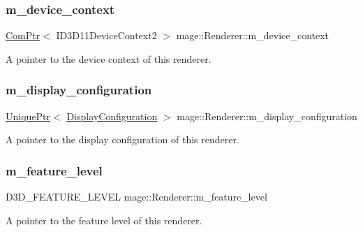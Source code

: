 \subsubsection{\texorpdfstring{m\+\_\+device\+\_\+context}{m\_device\_context}}
{\footnotesize\ttfamily \hyperlink{namespacemage_ae74f374780900893caa5555d1031fd79}{Com\+Ptr}$<$ I\+D3\+D11\+Device\+Context2 $>$ mage\+::\+Renderer\+::m\+\_\+device\+\_\+context\hspace{0.3cm}{\ttfamily [private]}}

A pointer to the device context of this renderer. \hypertarget{classmage_1_1_renderer_ab5638066fba5a0b9ce307f7db3ba5433}{}\label{classmage_1_1_renderer_ab5638066fba5a0b9ce307f7db3ba5433} 
\subsubsection{\texorpdfstring{m\+\_\+display\+\_\+configuration}{m\_display\_configuration}}
{\footnotesize\ttfamily \hyperlink{namespacemage_a3316d7143a973e37adf1110f2e80ca31}{Unique\+Ptr}$<$ \hyperlink{structmage_1_1_display_configuration}{Display\+Configuration} $>$ mage\+::\+Renderer\+::m\+\_\+display\+\_\+configuration\hspace{0.3cm}{\ttfamily [private]}}

A pointer to the display configuration of this renderer. \hypertarget{classmage_1_1_renderer_aa97b108ef58f7d41ddb527f6ba2bfdf9}{}\label{classmage_1_1_renderer_aa97b108ef58f7d41ddb527f6ba2bfdf9} 
\subsubsection{\texorpdfstring{m\+\_\+feature\+\_\+level}{m\_feature\_level}}
{\footnotesize\ttfamily D3\+D\+\_\+\+F\+E\+A\+T\+U\+R\+E\+\_\+\+L\+E\+V\+EL mage\+::\+Renderer\+::m\+\_\+feature\+\_\+level\hspace{0.3cm}{\ttfamily [private]}}

A pointer to the feature level of this renderer. \hypertarget{classmage_1_1_renderer_a72bb88b17491bd388460afae9d207b0a}{}\label{classmage_1_1_renderer_a72bb88b17491bd388460afae9d207b0a} 

